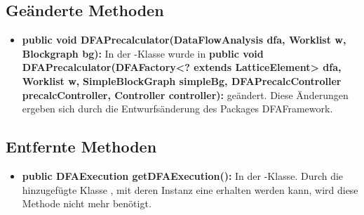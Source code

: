 \subsection{Geänderte Methoden}

\begin{itemize}
	\item \textbf{public void DFAPrecalculator(DataFlowAnalysis dfa, Worklist w, Blockgraph bg):} In der -Klasse wurde in \textbf{public void DFAPrecalculator(DFAFactory<? extends LatticeElement> dfa, Worklist w, }\textbf{SimpleBlockGraph simpleBg, DFAPrecalcController precalcController, Controller controller):} geändert. Diese Änderungen ergeben sich durch die Entwurfsänderung des Packages DFAFramework.
\end{itemize}


\subsection{Entfernte Methoden}

\begin{itemize}
	\item \textbf{public DFAExecution getDFAExecution():} In der -Klasse. Durch die hinzugefügte Klasse , mit deren Instanz eine  erhalten werden kann, wird diese Methode nicht mehr benötigt.
\end{itemize}

